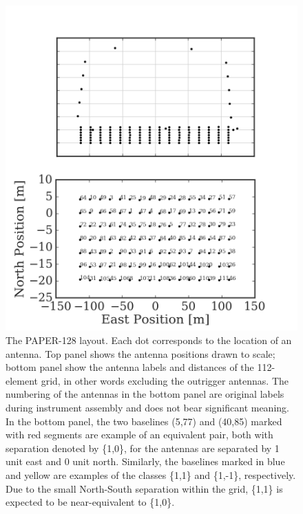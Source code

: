 \documentclass[twocolumn,apj,numberedappendix]{emulateapj}
\renewcommand\[{\begin{equation}}
\renewcommand\]{\end{equation}}
\begin{document}
\begin{figure}[H]
\includegraphics[width=\linewidth]{antpos128}

\caption{The PAPER-128 layout. Each dot corresponds to the location of
an antenna. Top panel shows the antenna positions drawn to scale;
bottom panel show the antenna labels and distances of the 112-element grid, in other words excluding the outrigger antennas.
The numbering of the antennas in the bottom panel are original labels
during instrument assembly and does not bear significant
meaning. In the bottom panel, the two baselines (5,77) and (40,85) marked with red segments are example of an equivalent pair, both with separation denoted by \{1,0\}, for the
antennas are separated by 1 unit east and 0 unit north. Similarly,
the baselines marked in blue and yellow are examples
of the classes \{1,1\} and \{1,-1\}, respectively. Due to the small North-South separation within the grid, \{1,1\} is expected to be near-equivalent to \{1,0\}. }
\label{fig:AntPos}
\end{figure}
\end{document}
